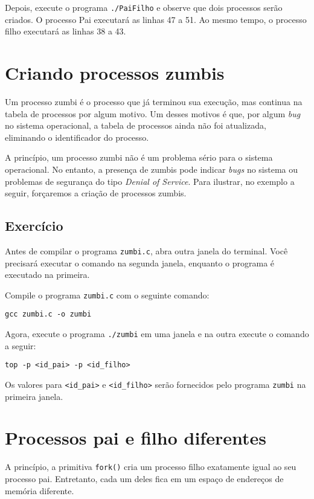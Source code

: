 Depois, execute o programa \texttt{./PaiFilho} e observe que dois processos serão criados. O processo Pai executará as linhas 47 a 51. Ao mesmo tempo, o processo filho executará as linhas 38 a 43.

\section{Criando processos zumbis}
Um processo zumbi é o processo que já terminou sua execução, mas continua na tabela de processos por algum motivo. Um desses motivos é que, por algum \textit{bug} no sistema operacional, a tabela de processos ainda não foi atualizada, eliminando o identificador do processo.

A princípio, um processo zumbi não é um problema sério para o sistema operacional. No entanto, a presença de zumbis pode indicar \textit{bugs} no sistema ou problemas de segurança do tipo \textit{Denial of Service}. Para ilustrar, no exemplo a seguir, forçaremos a criação de processos zumbis.



\subsection{Exercício}
Antes de compilar o programa \texttt{zumbi.c}, abra outra janela do terminal. Você precisará executar o comando  na segunda janela, enquanto o programa é executado na primeira.

Compile o programa \texttt{zumbi.c} com o seguinte comando:

\begin{lstlisting}[style=MyBashStyle]
gcc zumbi.c -o zumbi
\end{lstlisting}

Agora, execute o programa \texttt{./zumbi} em uma janela e na outra execute o comando a seguir:

\begin{lstlisting}[style=MyBashStyle]
top -p <id_pai> -p <id_filho>
\end{lstlisting}

Os valores para \texttt{<id\_pai>} e \texttt{<id\_filho>} serão fornecidos pelo programa \texttt{zumbi} na primeira janela.

\section{Processos pai e filho diferentes}
A princípio, a primitiva \texttt{fork()} cria um processo filho exatamente igual ao seu processo pai. Entretanto, cada um deles fica em um espaço de endereços de memória diferente.

